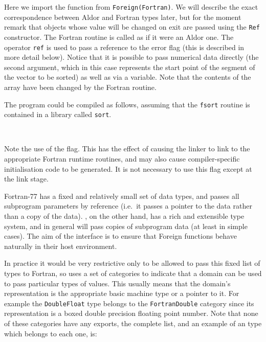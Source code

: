 \begin{description}
 Here we import the function from
\verb"Foreign(Fortran)".  We will describe the exact correspondence
between Aldor and Fortran types later, but for the moment remark that
objects whose value will be changed on exit are passed using the
\verb`Ref` constructor.
 The Fortran routine is called as if it were an Aldor
one.  The operator \verb`ref` is used to pass a reference to the error
flag (this is described in more detail below).  Notice that it is
possible to pass numerical data directly (the second argument, which
in this case represents the start point of the segment of the vector
to be sorted) as well as via a variable.
 Note that the contents of the array have been changed by
the Fortran routine.
\end{description}

The program could be compiled as follows, assuming that the
\verb`fsort` routine is contained in a library called \verb`sort`.  

\begin{small}
\osprompt\ 
\end{small}

Note the use of the  flag.  This has the effect of
causing the linker to link to the appropriate Fortran runtime
routines, and may also cause compiler-specific initialisation code to
be generated.  It is not necessary to use this flag except at the link
stage. 


Fortran-77 has a fixed and relatively small set of data types, and
passes all subprogram parameters by reference (i.e.~it passes a
pointer to the data rather than a copy of the data).  \asharp, on the
other hand, has a rich and extensible type system, and in general will
pass copies of subprogram data (at least in simple cases).   The aim
of the interface is to ensure that Foreign functions behave naturally
in their host environment.

In practice it would be very restrictive only to be allowed to pass this
fixed list of types to Fortran, so \asharp{} uses a set of categories
to indicate that a domain can be used to pass particular types of
values.  This usually means that the domain's representation is the
appropriate basic machine type or a pointer to it.  For example the
{\tt DoubleFloat} type belongs to the {\tt FortranDouble} category since
its representation is a boxed double precision floating point number.
Note that none of these categories have any exports, the complete list,
and an example of an \asharp{} type which belongs to each one, is:

